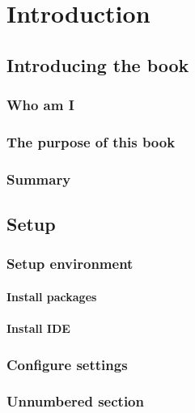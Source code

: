 \documentclass[12pt, a4paper]{book}
\begin{document}
\tableofcontents



\part{Introduction}



\chapter{Introducing the book}



\section{Who am I}
\blindtext

\section{The purpose of this book}
\Blindtext[3][1]

\section{Summary}
\Blindtext[3][1]



\chapter{Setup}



\section{Setup environment}
\subsection{Install packages}
\blindtext
\subsection{Install IDE}
\blindtext
\setlength\parskip{\baselineskip}

\section{Configure settings}
\blindtext

\section*{Unnumbered section}
\blindtext
\end{document}
